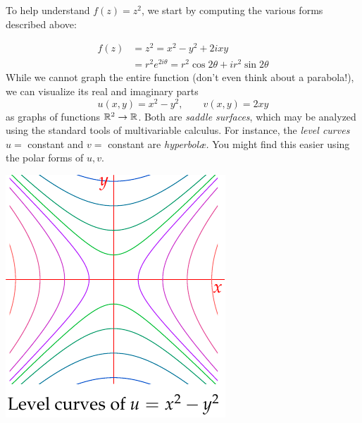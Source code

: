 \begin{example}{}{}
  To help understand $f(z)=z^2$, we start by computing the various forms described above:\par
	\begin{minipage}[t]{0.66\linewidth}\vspace{-10pt}
		\begin{align*}
			f(z) &=z^2 =x^2-y^2+2ixy\\
			&=r^2e^{2i\theta} =r^2\cos 2\theta + ir^2\sin 2\theta
		\end{align*}
		While we cannot graph the entire function (don't even think about a parabola!), we can visualize its real and imaginary parts
		\[
			u(x,y)=x^2-y^2,\qquad v(x,y)=2xy
		\]
		as graphs of functions $\mathbb{R}^2\to\mathbb{R}$. Both are \emph{saddle surfaces}, which may be analyzed using the standard tools of multivariable calculus. For instance, the \emph{level curves} $u=$ constant and $v=$ constant are \emph{hyperbolæ.} You might find this easier using the polar forms of $u,v$.
	\end{minipage}
	\hfill
	\begin{minipage}[t]{0.33\linewidth}\vspace{0pt}
		\flushright\includegraphics{functions-zsq}
	\end{minipage}
	\goodbreak
	

\end{example}
